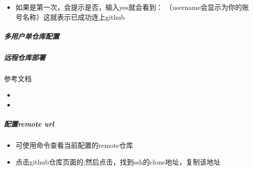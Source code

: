 \documentclass[a4paper,10pt,english]{sphinxmanual}
\begin{document}
\begin{figure}[htbp]
\centering

\noindent{}
\end{figure}
\begin{itemize}
\item {} 
如果是第一次，会提示是否，输入yes就会看到： （username会显示为你的账号名称）这就表示已成功连上github

\end{itemize}


\subparagraph{多用户单仓库配置}
\label{\detokenize{sphinx/2-collocation/1-github/2-ConfigRemote:id6}}

\subparagraph{远程仓库部署}
\label{\detokenize{sphinx/2-collocation/1-github/3-DeployRemote::doc}}\label{\detokenize{sphinx/2-collocation/1-github/3-DeployRemote:id1}}
参考文档
\begin{itemize}
\item {} 

\item {} 

\end{itemize}


\subparagraph{配置remote url}
\label{\detokenize{sphinx/2-collocation/1-github/3-DeployRemote:remote-url}}\begin{itemize}
\item {} 
可使用命令查看当前配置的remote仓库

\item {} 
点击github仓库页面的;然后点击，找到ssh的clone地址，复制该地址

\end{itemize}
\end{document}
